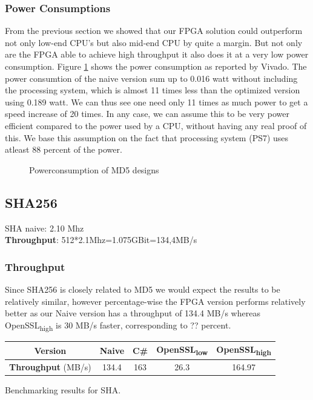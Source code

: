 \documentclass[a4paper]{article}
\begin{document}
\subsubsection{Power Consumptions}
\label{sec:orgfccf44b}
From the previous section we showed that our FPGA solution could outperform not only low-end CPU's but also mid-end CPU by quite a margin. But not only are the FPGA able to achieve high throughput it also does it at a very low power consumption. Figure \ref{fig:md5_naive_power} shows the power consumption as reported by Vivado. The power consumtion of the naive version sum up to 0.016 watt without including the processing system, which is almost 11 times less than the optimized version using 0.189 watt. We can thus see one need only 11 times as much power to get a speed increase of 20 times. In any case, we can assume this to be very power efficient compared to the power used by a CPU, without having any real proof of this. We base this assumption on the fact that processing system (PS7) uses atleast 88 percent of the power.
\begin{figure}[H]
\centering
{}
\caption[Power consumption of MD5 designs]%
{Powerconsumption of MD5 designs}
\label{fig:md5_naive_power}
\end{figure}

\subsection{SHA256}
\label{sec:org7ab82a0}
SHA naive: 2.10 Mhz\\
\textbf{Throughput}: 512*2.1Mhz=1.075GBit=134,4MB/s
\subsubsection{Throughput}
\label{sec:org894b939}
Since SHA256 is closely related to MD5 we would expect the results to be relatively similar, however percentage-wise the FPGA version performs relatively better as our Naive version has a throughput of 134.4 MB/s whereas OpenSSL\textsubscript{high} is 30 MB/s faster, corresponding to ?? percent.
\begin{table}[htbp]
\centering
\begin{tabular}{|c|c|c|c|c|}
\hline
\textbf{Version} & Naive & C\# & OpenSSL\textsubscript{low} & OpenSSL\textsubscript{high}\\
\hline
\textbf{Throughput} (MB/s) & 134.4 & 163 & 26.3 & 164.97\\
\hline
\end{tabular}
Benchmarking results for SHA.

\end{table}
\end{document}
